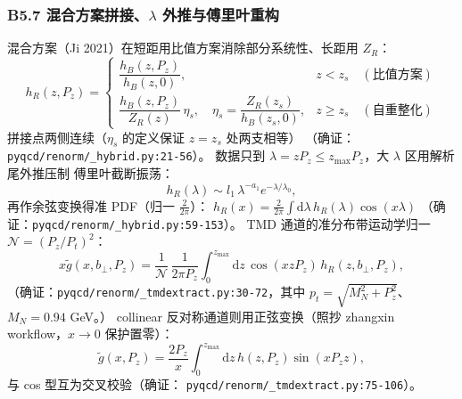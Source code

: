 \documentclass[UTF8]{ctexart}
\begin{document}
\subsubsection{B5.7 混合方案拼接、$\lambda$ 外推与傅里叶重构}
混合方案（Ji 2021）在短距用比值方案消除部分系统性、长距用 $Z_R$：
\begin{equation}
h_R(z,P_z)=
\begin{cases}
\dfrac{h_B(z,P_z)}{h_B(z,0)}, & z<z_s\quad(\text{比值方案})\\[8pt]
\dfrac{h_B(z,P_z)}{Z_R(z)}\,\eta_s,\quad \eta_s=\dfrac{Z_R(z_s)}{h_B(z_s,0)}, &
z\ge z_s\quad(\text{自重整化})
\end{cases}
\label{eq:hybrid}
\end{equation}
拼接点两侧连续（$\eta_s$ 的定义保证 $z=z_s$ 处两支相等）
（确证：\texttt{\nolinkurl{pyqcd/renorm/_hybrid.py:21-56}}）。
数据只到 $\lambda=zP_z\le z_{\max}P_z$，大 $\lambda$ 区用解析尾外推压制
傅里叶截断振荡：
\begin{equation}
h_R(\lambda)\sim l_1\,\lambda^{-a_1}e^{-\lambda/\lambda_0},
\label{eq:lambdatail}
\end{equation}
再作余弦变换得准 PDF（归一 $\frac{2}{2\pi}$）：
$h_R(x)=\frac{2}{2\pi}\int\mathrm d\lambda\,h_R(\lambda)\cos(x\lambda)$
（确证：\texttt{\nolinkurl{pyqcd/renorm/_hybrid.py:59-153}}）。
TMD 通道的准分布带运动学归一 $\mathcal N=(P_z/P_t)^2$：
\begin{equation}
x\tilde g(x,b_\perp,P_z)=\frac{1}{\mathcal N}\,
\frac{1}{2\pi P_z}\int_0^{z_{\max}}\!\mathrm dz\,
\cos(x z P_z)\,h_R(z,b_\perp,P_z),
\label{eq:quasitmd}
\end{equation}
（确证：\texttt{\nolinkurl{pyqcd/renorm/_tmdextract.py:30-72}}，其中
$p_t=\sqrt{M_N^2+P_z^2}$、$M_N=0.94$ GeV。）
collinear 反对称通道则用正弦变换（照抄 zhangxin workflow，$x\to0$ 保护置零）：
\begin{equation}
\tilde g(x,P_z)=\frac{2P_z}{x}\int_0^{z_{\max}}\!\mathrm dz\,
h(z,P_z)\sin(x P_z z),
\label{eq:sinpdf}
\end{equation}
与 cos 型互为交叉校验（确证：
\texttt{\nolinkurl{pyqcd/renorm/_tmdextract.py:75-106}}）。
\end{document}
